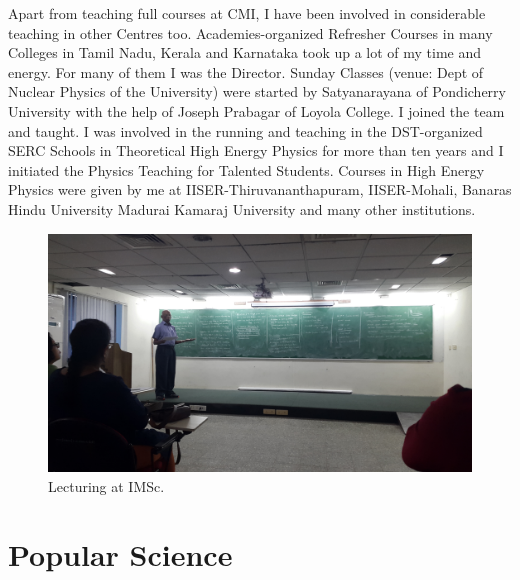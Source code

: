 Apart from teaching full courses at CMI, I have been involved in 
considerable teaching in other Centres too. Academies-organized 
Refresher Courses in many Colleges in Tamil Nadu, Kerala and Karnataka 
took up a lot of my time and energy. For many of them I was the 
Director. Sunday Classes (venue: Dept of Nuclear Physics of the 
University) were started by Satyanarayana of Pondicherry University with 
the help of Joseph Prabagar of Loyola College. I joined the team and 
taught. I was involved in the running and teaching in the DST-organized 
SERC Schools in Theoretical High Energy Physics for more than ten years 
and I initiated the Physics Teaching for Talented Students. Courses in 
High Energy Physics were given by me at IISER-Thiruvananthapuram, 
IISER-Mohali, Banaras Hindu University Madurai Kamaraj University and 
many other institutions.
\begin{figure}[h]
\centering
\includegraphics[width=\textwidth]{images/rajaji-teach1.jpg}
\caption{Lecturing at IMSc.}
\end{figure}

\section*{Popular Science}

